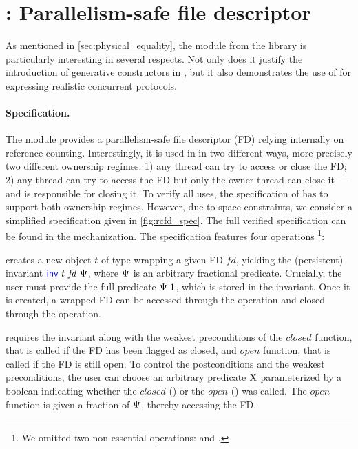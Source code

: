 \section{: Parallelism-safe file descriptor}
\label{sec:rcfd}

\newcommand{\inv}{%
  \textcolor{blue}{\textlog{inv}}%
}
\newcommand{\closing}{%
  \textcolor{red}{\textlog{closing}}%
}



As mentioned in \cref{sec:physical_equality}, the  module from the \Eio library is particularly interesting in several respects.
Not only does it justify the introduction of generative constructors in \OCaml, but it also demonstrates the use of \Iris for expressing realistic concurrent protocols.

\paragraph{Specification.}
The  module provides a parallelism-safe file descriptor (FD) relying internally on reference-counting.
Interestingly, it is used in \Eio in two different ways, more precisely two different ownership regimes: 1) any thread can try to access or close the FD; 2) any thread can try to access the FD but only the owner thread can close it --- and is responsible for closing it.
To verify all uses, the specification of  has to support both ownership regimes.
However, due to space constraints, we consider a simplified specification given in \cref{fig:rcfd_spec}.
The full verified specification can be found in the mechanization.
%
The specification features four operations%
\footnote{
We omitted two non-essential operations:  and .
}:

 creates a new object $t$ of type  wrapping a given FD $\mathit{fd}$, yielding the (persistent) invariant $\inv\ t\ \mathit{fd}\ \iPredTwo$, where $\Psi$ is an arbitrary fractional predicate.
Crucially, the user must provide the full predicate $\Psi\ 1$, which is stored in the invariant.
Once it is created, a wrapped FD can be accessed through the  operation and closed through the  operation.

 requires the invariant along with the weakest preconditions of the $\mathit{closed}$ function, that is called if the FD has been flagged as closed, and $\mathit{open}$ function, that is called if the FD is still open.
To control the postconditions and the weakest preconditions, the user can choose an arbitrary predicate $\mathrm{X}$ parameterized by a boolean indicating whether the $\mathit{closed}$ () or the $\mathit{open}$ () was called.
The $\mathit{open}$ function is given a fraction of $\Psi$, thereby accessing the FD.

